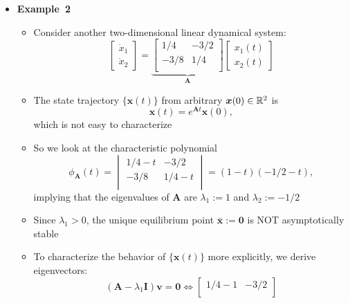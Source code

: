 \documentclass[12pt,a4paper]{article}
\begin{document}
\begin{itemize}
\item \textbf{Example~2}
  \begin{itemize}
  \item Consider another two-dimensional linear dynamical system:
    \begin{equation}\nonumber%
      \begin{bmatrix}
        \dot{x}_{1} \\
        \dot{x}_{2}
      \end{bmatrix}
      =
      \underbrace{
      \begin{bmatrix}
        1/4 & -3/2 \\
        -3/8 & 1/4 \\
      \end{bmatrix}}_{\bm{A}}
      \begin{bmatrix}
        x_{1}(t) \\
        x_{2}(t)
      \end{bmatrix}
    \end{equation}
    \item The state trajectory $\{\bm{x}(t)\}$ from arbitrary $\bm{x}(0)\in \mathbb{R}^{2}$ is
      \begin{equation}\nonumber%
        \bm{x}(t)
        =
        e^{\bm{A}t}\bm{x}(0),
    \end{equation}
    which is not easy to characterize
  \item So we look at the characteristic polynomial
    \begin{equation}\nonumber%
      \phi_{\bm{A}}(t) = 
      \begin{vmatrix}
        1/4 - t & -3/2 \\
        -3/8 & 1/4 - t \\
      \end{vmatrix}
      = (1-t)(-1/2-t),
    \end{equation}
    implying that
    the eigenvalues of $\bm{A}$ are $\lambda_{1}:=1$ and $\lambda_{2}:=-1/2$
  \item Since $\lambda_{1}>0$,
    the unique equilibrium point
    $\bar{\bm{x}}:=\bm{0}$ is NOT asymptotically stable
  \item To characterize the behavior of $\{\bm{x}(t)\}$ more explicitly,
    we derive eigenvectors:
    \begin{equation}\nonumber%
      (\bm{A}-\lambda_{1}\bm{I})\bm{v}
      = \bm{0}
      \iff
      \begin{bmatrix}
        1/4 - 1 & - 3/2 \\

\end{bmatrix}
\end{equation}
\end{itemize}
\end{itemize}
\end{document}
